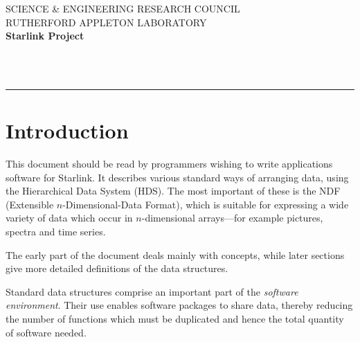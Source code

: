 \newcommand{\numcir}[1]{\mbox{\hspace{3ex}$\bigcirc$\hspace{-1.7ex}{\small #1}}}
\begin{htmlonly}
\renewcommand{\numcir}[1]{~~~~~~ #1} 
\end{htmlonly}

\newcommand{\lsk}{\raisebox{-0.4ex}{\rm *}}


\thispagestyle{empty}
SCIENCE \& ENGINEERING RESEARCH COUNCIL \hfill \stardocname\\
RUTHERFORD APPLETON LABORATORY\\
{\large\bf Starlink Project\\}
{\large\bf \stardoccategory\ \stardocnumber}
\begin{flushright}
\stardocauthors\\
\stardocdate
\end{flushright}
\vspace{-4mm}
\rule{\textwidth}{0.5mm}
\vspace{5mm}
\begin{center}
{\Large\bf \stardoctitle}
\end{center}
\vspace{5mm}

\setlength{\parskip}{0mm}
\tableofcontents
\setlength{\parskip}{\medskipamount}
\markright{\stardocname}

\section{Introduction}
\label{se:intro}

This document should be read by programmers wishing to write
applications software for Starlink.  It describes various
standard ways of arranging data, using the Hierarchical
Data System (HDS).  The most important of these is the NDF
(Extensible $n$-Dimensional-Data Format), which is suitable for
expressing a wide variety of data which occur in $n$-dimensional
arrays---for example pictures, spectra and time series.

The early part of the document deals mainly with
concepts, while later sections give more detailed
definitions of the data structures.

Standard data structures comprise an important part of the
{\it software environment}.
Their use enables software packages to share data, thereby
reducing the number of functions which must be
duplicated and hence
the total quantity of software needed.

